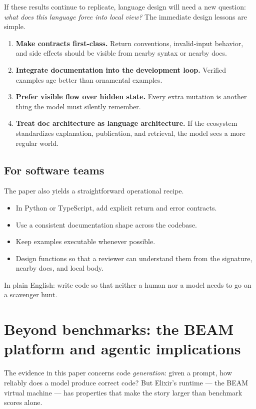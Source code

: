 \documentclass[11pt]{article}
\newcommand{\elixir}{Elixir}
\begin{document}
If these results continue to replicate, language design will need a new question: \emph{what does this language force into local view?} The immediate design lessons are simple.

\begin{enumerate}
  \item \textbf{Make contracts first-class.} Return conventions, invalid-input behavior, and side effects should be visible from nearby syntax or nearby docs.
  \item \textbf{Integrate documentation into the development loop.} Verified examples age better than ornamental examples.
  \item \textbf{Prefer visible flow over hidden state.} Every extra mutation is another thing the model must silently remember.
  \item \textbf{Treat doc architecture as language architecture.} If the ecosystem standardizes explanation, publication, and retrieval, the model sees a more regular world.
\end{enumerate}

\subsection{For software teams}

The paper also yields a straightforward operational recipe.

\begin{itemize}
  \item In Python or TypeScript, add explicit return and error contracts.
  \item Use a consistent documentation shape across the codebase.
  \item Keep examples executable whenever possible.
  \item Design functions so that a reviewer can understand them from the signature, nearby docs, and local body.
\end{itemize}

In plain English: write code so that neither a human nor a model needs to go on a scavenger hunt.

\section{Beyond benchmarks: the BEAM platform and agentic implications}
\label{sec:beam}

The evidence in this paper concerns code \emph{generation}: given a prompt, how reliably does a model produce correct code? But \elixir{}'s runtime --- the BEAM virtual machine --- has properties that make the story larger than benchmark scores alone.
\end{document}
